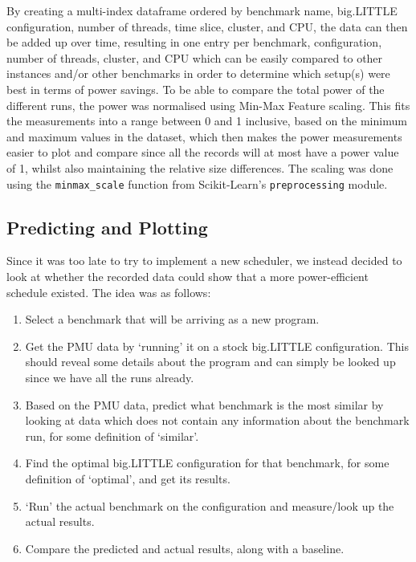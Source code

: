    By creating a multi-index dataframe ordered by benchmark name, big.LITTLE 
    configuration, number of threads, time slice, cluster, and CPU, the data 
    can then be added up over time, resulting in one entry per benchmark, 
    configuration, number of threads, cluster, and CPU which can be easily 
    compared to other instances and/or other benchmarks in order to determine 
    which setup(s) were best in terms of power savings. To be able to compare 
    the total power of the different runs, the power was normalised using 
    Min-Max Feature scaling. This fits the measurements into a range between 0 
    and 1 inclusive, based on the minimum and maximum values in the dataset, 
    which then makes the power measurements easier to plot and compare since 
    all the records will at most have a power value of 1, whilst also 
    maintaining the relative size differences. The scaling was done using the 
    \texttt{minmax\_scale} function from Scikit-Learn's 
    \cite{pedregosa_scikit-learn_2011} \texttt{preprocessing} module.
    
    \subsection{Predicting and Plotting}
    Since it was too late to try to implement a new scheduler, we instead 
    decided to look at whether the recorded data could show that a more 
    power-efficient schedule existed. The idea was as follows:
    \begin{enumerate}
        \item Select a benchmark that will be arriving as a new program.
        \item Get the PMU data by `running' it on a stock big.LITTLE
              configuration. This should reveal some details about the program
              and can simply be looked up since we have all the runs already.
        \item Based on the PMU data, predict what benchmark is the most similar
              by looking at data which does not contain any information about 
              the benchmark run, for some definition of `similar'.
        \item Find the optimal big.LITTLE configuration for that benchmark, for
              some definition of `optimal', and get its results.
        \item `Run' the actual benchmark on the configuration and measure/look
              up the actual results.
        \item Compare the predicted and actual results, along with a baseline.
    \end{enumerate}

